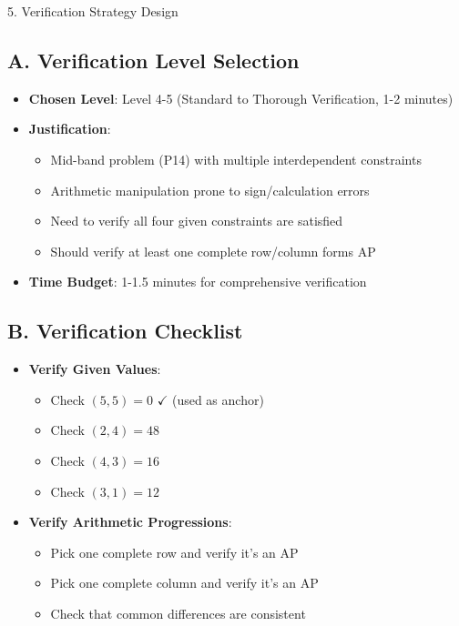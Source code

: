 \documentclass[12pt]{article}
\begin{document}
\begin{verificationbox}{5. Verification Strategy Design}

\subsection*{A. Verification Level Selection}
\begin{itemize}[leftmargin=*]
    \item \textbf{Chosen Level}: Level 4-5 (Standard to Thorough Verification, 1-2 minutes)
    
    \item \textbf{Justification}: 
    \begin{itemize}
        \item Mid-band problem (P14) with multiple interdependent constraints
        \item Arithmetic manipulation prone to sign/calculation errors
        \item Need to verify all four given constraints are satisfied
        \item Should verify at least one complete row/column forms AP
    \end{itemize}
    
    \item \textbf{Time Budget}: 1-1.5 minutes for comprehensive verification
\end{itemize}

\subsection*{B. Verification Checklist}
\begin{itemize}[leftmargin=*]
    \item \textbf{Verify Given Values}:
    \begin{itemize}
        \item Check $(5,5) = 0$ $\checkmark$ (used as anchor)
        \item Check $(2,4) = 48$
        \item Check $(4,3) = 16$
        \item Check $(3,1) = 12$
    \end{itemize}
    
    \item \textbf{Verify Arithmetic Progressions}:
    \begin{itemize}
        \item Pick one complete row and verify it's an AP
        \item Pick one complete column and verify it's an AP
        \item Check that common differences are consistent
    \end{itemize}
    

\end{itemize}
\end{verificationbox}
\end{document}
